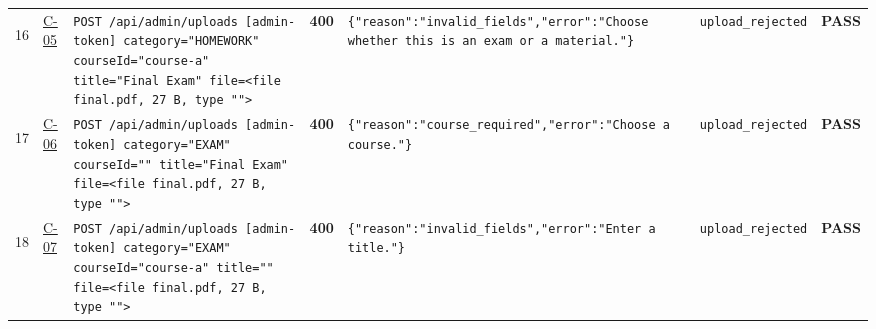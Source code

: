 \documentclass[10pt,a4paper]{article}
\begin{document}
\begin{landscape}
\begin{longtable}{@{}P{0.6cm}P{0.9cm}P{8.5cm}P{1.0cm}P{6.2cm}P{4.2cm}P{1.1cm}@{}}
\hypertarget{call16}{16} & \hyperlink{test-C-05}{C-05} & \texttt{POST /\allowbreak{}api/\allowbreak{}admin/\allowbreak{}uploads [admin-\allowbreak{}token] category=\allowbreak{}"\allowbreak{}HOMEWORK"\allowbreak{} courseId=\allowbreak{}"\allowbreak{}course-\allowbreak{}a"\allowbreak{} title=\allowbreak{}"\allowbreak{}Final Exam"\allowbreak{} file=\allowbreak{}<file final.\allowbreak{}pdf,\allowbreak{} 27 B,\allowbreak{} type "\allowbreak{}"\allowbreak{}>} & \textcolor{warnamber}{\textbf{400}} & \texttt{\{"\allowbreak{}reason"\allowbreak{}:\allowbreak{}"\allowbreak{}invalid\_\allowbreak{}fields"\allowbreak{},\allowbreak{}"\allowbreak{}error"\allowbreak{}:\allowbreak{}"\allowbreak{}Choose whether this is an exam or a material.\allowbreak{}"\allowbreak{}\}} & \texttt{upload\_\allowbreak{}rejected} & \textcolor{passgreen}{\textbf{PASS}} \\
\hypertarget{call17}{17} & \hyperlink{test-C-06}{C-06} & \texttt{POST /\allowbreak{}api/\allowbreak{}admin/\allowbreak{}uploads [admin-\allowbreak{}token] category=\allowbreak{}"\allowbreak{}EXAM"\allowbreak{} courseId=\allowbreak{}"\allowbreak{}"\allowbreak{} title=\allowbreak{}"\allowbreak{}Final Exam"\allowbreak{} file=\allowbreak{}<file final.\allowbreak{}pdf,\allowbreak{} 27 B,\allowbreak{} type "\allowbreak{}"\allowbreak{}>} & \textcolor{warnamber}{\textbf{400}} & \texttt{\{"\allowbreak{}reason"\allowbreak{}:\allowbreak{}"\allowbreak{}course\_\allowbreak{}required"\allowbreak{},\allowbreak{}"\allowbreak{}error"\allowbreak{}:\allowbreak{}"\allowbreak{}Choose a course.\allowbreak{}"\allowbreak{}\}} & \texttt{upload\_\allowbreak{}rejected} & \textcolor{passgreen}{\textbf{PASS}} \\
\hypertarget{call18}{18} & \hyperlink{test-C-07}{C-07} & \texttt{POST /\allowbreak{}api/\allowbreak{}admin/\allowbreak{}uploads [admin-\allowbreak{}token] category=\allowbreak{}"\allowbreak{}EXAM"\allowbreak{} courseId=\allowbreak{}"\allowbreak{}course-\allowbreak{}a"\allowbreak{} title=\allowbreak{}"\allowbreak{}"\allowbreak{} file=\allowbreak{}<file final.\allowbreak{}pdf,\allowbreak{} 27 B,\allowbreak{} type "\allowbreak{}"\allowbreak{}>} & \textcolor{warnamber}{\textbf{400}} & \texttt{\{"\allowbreak{}reason"\allowbreak{}:\allowbreak{}"\allowbreak{}invalid\_\allowbreak{}fields"\allowbreak{},\allowbreak{}"\allowbreak{}error"\allowbreak{}:\allowbreak{}"\allowbreak{}Enter a title.\allowbreak{}"\allowbreak{}\}} & \texttt{upload\_\allowbreak{}rejected} & \textcolor{passgreen}{\textbf{PASS}} \\

\end{longtable}
\end{landscape}
\end{document}
